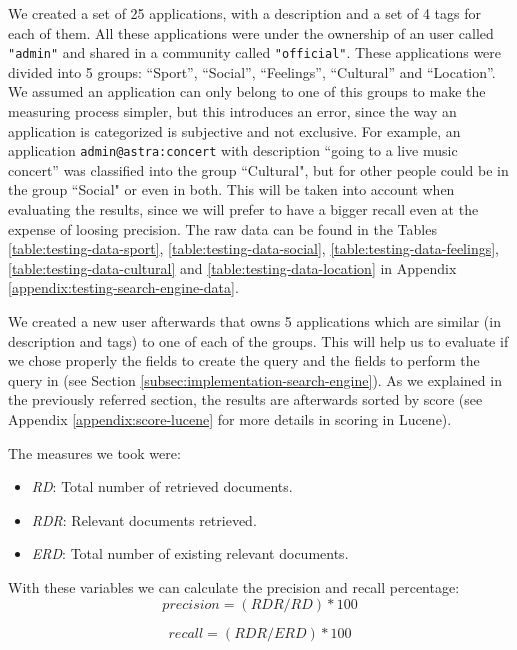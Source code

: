 We created a set of 25 applications, with a description and a set of 4 tags
for each of them. All these applications were under the ownership of an user
called \verb|"admin"| and shared in a community called \verb|"official"|. These
applications were divided into 5 groups: ``Sport'', ``Social'', ``Feelings'',
``Cultural'' and ``Location''. We assumed an application can only belong to one
of this groups to make the measuring process simpler, but this introduces an
error, since the way an application is categorized is subjective and not
exclusive. For example, an application \verb|admin@astra:concert| with
description ``going to a live music concert'' was classified into the group 
``Cultural", but for other people could be in the group ``Social" or even in
both. This will be taken into account when evaluating the results, since we will 
prefer to have a bigger recall even at the expense of loosing precision. The
raw data can be found in the Tables \ref{table:testing-data-sport}, 
\ref{table:testing-data-social}, \ref{table:testing-data-feelings}, 
\ref{table:testing-data-cultural} and \ref{table:testing-data-location} in
Appendix \ref{appendix:testing-search-engine-data}.

We created a new user afterwards that owns 5 applications which are similar (in
description and tags) to one of each of the groups. This will help us to
evaluate if we chose properly the fields to create the query and the fields to
perform the query in (see Section \ref{subsec:implementation-search-engine}).
As we explained in the previously referred section, the results are afterwards
sorted by score (see Appendix \ref{appendix:score-lucene} for more details in
scoring in Lucene).

The measures we took were:

\begin{itemize}
  \item \emph{RD}: Total number of retrieved documents.
  \item \emph{RDR}: Relevant documents retrieved.
  \item \emph{ERD}: Total number of existing relevant documents.
\end{itemize}

With these variables we can calculate the precision and recall percentage:
\[
precision = (RDR/RD)*100
\]

\[
recall = (RDR/ERD)*100
\]




